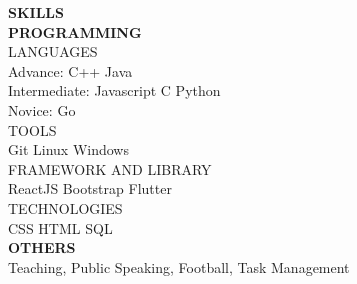 \documentclass[a4paper, oneside, 12pt]{article}
\begin{document}
\begin{Parallel}{0.39\textwidth}{0.58\textwidth}
{		\noindent
		\textsf{{\large \textbf{SKILLS}}} \\
		\textsf{\textbf {PROGRAMMING}} \\
		
		\noindent
		\textsf{LANGUAGES} \\
		\indent\textsf{\textmd{Advance:}} \textsf{C++} \textsf{Java}\\
		\indent\textsf{\textmd{Intermediate:}} \textsf{Javascript} \textsf{C} \textsf{Python}\\
		\indent\textsf{\textmd{Novice:}} \textsf{Go}\\
		
		\noindent
		\textsf{TOOLS} \\
		\indent\textsf{Git} \hspace{3mm} \textsf{Linux} \hspace{3mm} \textsf{Windows} \\
		
		\noindent \textsf{FRAMEWORK AND LIBRARY} \\
		\indent\textsf{ReactJS} \hspace{3mm} \textsf{Bootstrap} \hspace{3mm} \textsf{Flutter} \\
		
		\noindent \textsf{TECHNOLOGIES} \\
		\indent\textsf{CSS} \hspace{3mm} \textsf{HTML} \hspace{3mm} \textsf{SQL} \\
		
		\noindent
		\textsf{\textbf {OTHERS}} \\
		\textsf{Teaching, Public Speaking, Football, Task Management} \\
		    
	}
\end{Parallel}
\end{document}
